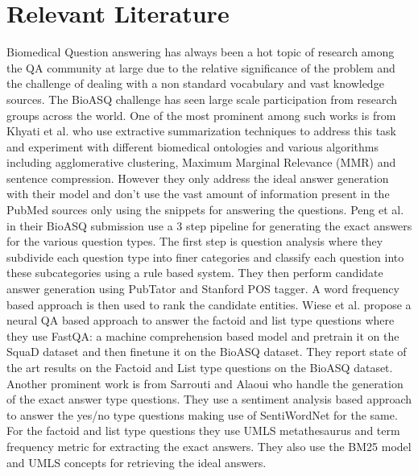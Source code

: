 \documentclass[11pt,a4paper]{article}
\begin{document}
\section{Relevant Literature}
\label{lit}
Biomedical Question answering has always been a hot topic of research among the QA community at large due to the relative significance of the problem and the challenge of dealing with a non standard vocabulary and vast knowledge sources. The BioASQ challenge has seen large scale participation from research groups across the world. One of the most prominent among such works is from Khyati et al.  who use  extractive summarization techniques to address this task and experiment with different biomedical ontologies and various algorithms including agglomerative clustering, Maximum Marginal Relevance (MMR) and sentence compression. However they only address the ideal answer generation with their model and don't use the vast amount of information present in the PubMed sources only using the snippets for answering the questions. Peng et al.  in their BioASQ submission use a 3 step pipeline for generating the exact answers for the various question types. The first step is question analysis where they subdivide each question type into finer categories and classify each question into these subcategories using a rule based system. They then perform candidate answer generation using PubTator and Stanford POS tagger. A word frequency based approach is then used to rank the candidate entities. Wiese et al.  propose a neural QA based approach to answer the factoid and list type questions where they use FastQA: a machine comprehension based model \cite{fastqa-squad} and pretrain it on the SquaD dataset \cite{squad} and then finetune it on the BioASQ dataset. They report state of the art results on the Factoid and List type questions on the BioASQ dataset. Another prominent work is from Sarrouti and Alaoui  who handle the generation of the exact answer type questions. They use a sentiment analysis based approach to answer the yes/no type questions making use of SentiWordNet for the same. For the factoid and list type questions they use UMLS metathesaurus and term frequency metric for extracting the exact
answers. They also use the BM25 model and UMLS concepts for retrieving the ideal answers.
\end{document}
